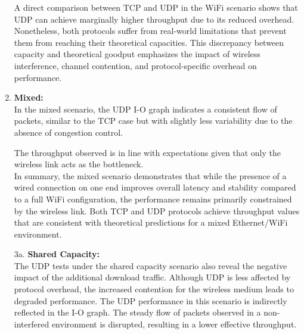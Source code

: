 \begin{enumerate}
                A direct comparison between TCP and UDP in the WiFi scenario shows that UDP can achieve marginally higher throughput due to its reduced overhead. 
                Nonetheless, both protocols suffer from real-world limitations that prevent them from reaching their theoretical capacities. 
                This discrepancy between capacity and theoretical goodput emphasizes the impact of wireless interference, channel contention, and protocol-specific overhead on performance.

            \item \textbf{Mixed:} \\
                In the mixed scenario, the UDP I-O graph indicates a consistent flow of packets, similar to the TCP case but with slightly less variability due to the absence of congestion control.
                

                The throughput observed is in line with expectations given that only the wireless link acts as the bottleneck. \\

                In summary, the mixed scenario demonstrates that while the presence of a wired connection on one end improves overall latency and stability compared to a full WiFi configuration, the performance remains primarily constrained by the wireless link. 
                Both TCP and UDP protocols achieve throughput values that are consistent with theoretical predictions for a mixed Ethernet/WiFi environment.
                
            \item[3a.] \textbf{Shared Capacity:} \\
                The UDP tests under the shared capacity scenario also reveal the negative impact of the additional download traffic. 
                Although UDP is less affected by protocol overhead, the increased contention for the wireless medium leads to degraded performance.
                The UDP performance in this scenario is indirectly reflected in the I-O graph.
                The steady flow of packets observed in a non-interfered environment is disrupted, resulting in a lower effective throughput.


\end{enumerate}
